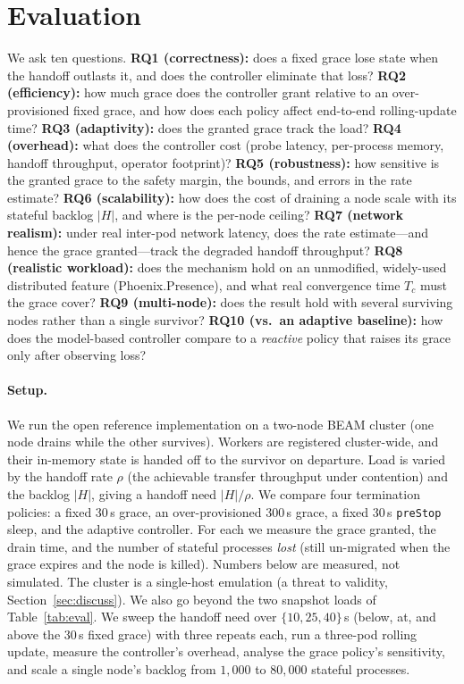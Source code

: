\documentclass[AMA,Times1COL]{WileyNJDv5}
\begin{document}
\section{Evaluation}\label{sec:eval}

We ask ten questions. \textbf{RQ1 (correctness):} does a fixed grace lose state when the handoff
outlasts it, and does the controller eliminate that loss? \textbf{RQ2 (efficiency):} how much grace
does the controller grant relative to an over-provisioned fixed grace, and how does each policy
affect end-to-end rolling-update time? \textbf{RQ3 (adaptivity):} does the granted grace track the
load? \textbf{RQ4 (overhead):} what does the controller cost (probe latency, per-process memory,
handoff throughput, operator footprint)? \textbf{RQ5 (robustness):} how sensitive is the granted
grace to the safety margin, the bounds, and errors in the rate estimate?
\textbf{RQ6 (scalability):} how does the cost of draining a node scale with its stateful backlog
$|H|$, and where is the per-node ceiling?
\textbf{RQ7 (network realism):} under real inter-pod network latency, does the rate estimate---and
hence the grace granted---track the degraded handoff throughput?
\textbf{RQ8 (realistic workload):} does the mechanism hold on an unmodified, widely-used distributed
feature (Phoenix.Presence), and what real convergence time $T_c$ must the grace cover?
\textbf{RQ9 (multi-node):} does the result hold with several surviving nodes rather than a single
survivor? \textbf{RQ10 (vs.\ an adaptive baseline):} how does the model-based controller compare to a
\emph{reactive} policy that raises its grace only after observing loss?

\paragraph{Setup.} We run the open reference implementation on a two-node BEAM cluster (one node
drains while the other survives). Workers are registered cluster-wide, and their in-memory state is
handed off to the survivor on departure. Load is varied by the handoff rate $\rho$ (the achievable
transfer throughput under contention) and the backlog $|H|$, giving a handoff need $|H|/\rho$. We
compare four termination policies: a fixed 30\,s grace, an over-provisioned 300\,s grace, a fixed
30\,s \texttt{preStop} sleep, and the adaptive controller. For each we measure the grace granted,
the drain time, and the number of stateful processes \emph{lost} (still un-migrated when the grace
expires and the node is killed). Numbers below are measured, not simulated. The cluster is a
single-host emulation (a threat to validity, Section~\ref{sec:discuss}). We also go beyond the two
snapshot loads of Table~\ref{tab:eval}. We sweep the handoff need over $\{10,25,40\}$\,s (below, at, and
above the 30\,s fixed grace) with three repeats each, run a three-pod rolling update, measure the
controller's overhead, analyse the grace policy's sensitivity, and scale a single node's backlog
from $1{,}000$ to $80{,}000$ stateful processes.
\end{document}
